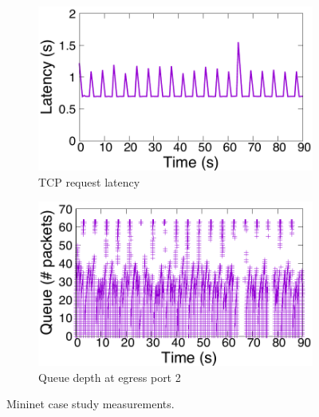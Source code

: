 \begin{figure}[!t]
\centering
\vspace{-0.1in}
\begin{subfigure}[t]{0.48\columnwidth}
\raggedright
\includegraphics[width=\linewidth]{pq_fetch_latency.pdf}
\vspace{-0.2in}
\caption{TCP request latency}
\label{fig:mininet-latency}
\end{subfigure}
\begin{subfigure}[t]{0.48\columnwidth}
\raggedleft
\includegraphics[width=\linewidth]{pq_queue_sizes.pdf}
\vspace{-0.2in}
\caption{Queue depth at egress port 2}
\label{fig:mininet-qin}
\end{subfigure}
\vspace{0.05in}
\caption{Mininet case study measurements.}
\end{figure}

